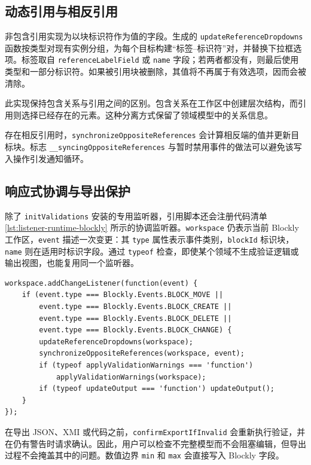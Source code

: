 \subsection{动态引用与相反引用}

非包含引用实现为以块标识符作为值的字段。生成的
\texttt{updateReference}\allowbreak\texttt{Dropdowns} 函数按类型对现有实例分组，为每个目标构建“标签--标识符”对，并替换下拉框选项。标签取自 \texttt{referenceLabel}\allowbreak\texttt{Field} 或 \texttt{name} 字段；若两者都没有，则最后使用类型和一部分标识符。如果被引用块被删除，其值将不再属于有效选项，因而会被清除。

此实现保持包含关系与引用之间的区别。包含关系在工作区中创建层次结构，而引用则选择已经存在的元素。这种分离方式保留了领域模型中的关系信息。

存在相反引用时，\texttt{synchronizeOppositeReferences} 会计算相反端的值并更新目标块。标志 \texttt{\_\_syncingOpposite}\allowbreak\texttt{References} 与暂时禁用事件的做法可以避免该写入操作引发通知循环。

\subsection{响应式协调与导出保护}

除了 \texttt{initValidations} 安装的专用监听器，引用脚本还会注册代码清单 \ref{lst:listener-runtime-blockly} 所示的协调监听器。\texttt{workspace} 仍表示当前 Blockly 工作区，\texttt{event} 描述一次变更：其 \texttt{type} 属性表示事件类别，\texttt{blockId} 标识块，\texttt{name} 则在适用时标识字段。通过 \texttt{typeof} 检查，即使某个领域不生成验证逻辑或输出视图，也能复用同一个监听器。

\begin{lstlisting}[style=tfmjavascript, caption={生成编辑器的响应式更新监听器}, label={lst:listener-runtime-blockly}]
workspace.addChangeListener(function(event) {
    if (event.type === Blockly.Events.BLOCK_MOVE ||
        event.type === Blockly.Events.BLOCK_CREATE ||
        event.type === Blockly.Events.BLOCK_DELETE ||
        event.type === Blockly.Events.BLOCK_CHANGE) {
        updateReferenceDropdowns(workspace);
        synchronizeOppositeReferences(workspace, event);
        if (typeof applyValidationWarnings === 'function')
            applyValidationWarnings(workspace);
        if (typeof updateOutput === 'function') updateOutput();
    }
});
\end{lstlisting}

在导出 JSON、XMI 或代码之前，\texttt{confirmExportIfInvalid} 会重新执行验证，并在仍有警告时请求确认。因此，用户可以检查不完整模型而不会阻塞编辑，但导出过程不会掩盖其中的问题。数值边界 \texttt{min} 和 \texttt{max} 会直接写入 Blockly 字段。

